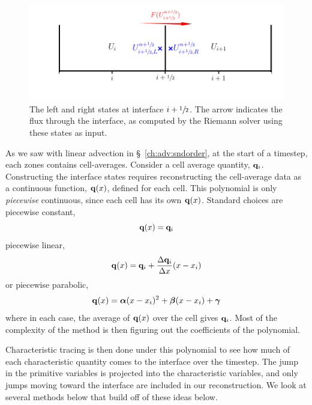 \begin{figure}[t]
\centering
\includegraphics[width=\linewidth]{riemann_comp}
\caption[The left and right states for the Riemann
  problem]{\label{fig:riemann} The left and right states at interface
  $i+{\sfrac{1}{2}}$.  The arrow indicates the flux through the interface, as
  computed by the Riemann solver using these states as input.}
\end{figure}

As we saw with linear advection in \S~\ref{ch:adv:sndorder},
at the start of a timestep, each zones contains cell-averages.
Consider a cell average quantity, ${\bf q}_i$.
Constructing the interface states requires reconstructing the
cell-average data as a continuous function, ${\bf q}(x)$, defined for
each cell.  This polynomial is only {\em piecewise} continuous, since
each cell has its own ${\bf q}(x)$.  Standard choices are piecewise constant,
\begin{equation}
{\bf q}(x) = {\bf q}_i
\end{equation}
piecewise linear,
\begin{equation}
{\bf q}(x) = {\bf q}_i + \frac{\Delta {\bf q}_i}{\Delta x}(x - x_i)
\end{equation}
or piecewise parabolic,
\begin{equation}
{\bf q}(x) = \boldsymbol{\alpha} (x - x_i)^2 + \boldsymbol{\beta} (x - x_i) + \boldsymbol{\gamma}
\end{equation}
where in each case, the average of ${\bf q}(x)$ over the cell gives ${\bf q}_i$.
Most of the complexity of the method is then figuring out the coefficients
of the polynomial.

Characteristic tracing is then done under this polynomial to see how
much of each characteristic quantity comes to the interface over the
timestep.  The jump in the primitive variables is projected into the
characteristic variables, and only jumps moving toward the interface
are included in our reconstruction.  We look at several methods below
that build off of these ideas below.

